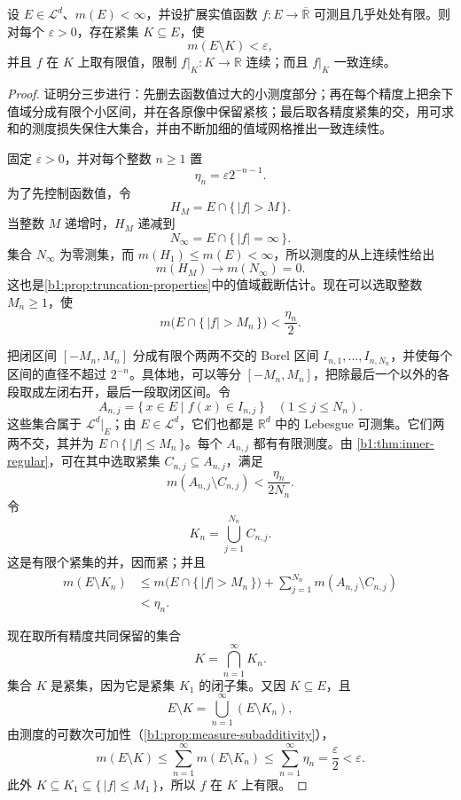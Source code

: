 \begin{theorem}[Lusin]
\label{b1:thm:lusin}
设 \(E\in\mathcal L^d\)、\(m(E)<\infty\)，并设扩展实值函数
\(f:E\rightarrow\overline{\mathbb R}\) 可测且几乎处处有限。则对每个
\(\varepsilon>0\)，存在紧集 \(K\subseteq E\)，使
\[
m(E\setminus K)<\varepsilon,
\]
并且 \(f\) 在 \(K\) 上取有限值，限制 \(f|_K:K\rightarrow\mathbb R\) 连续；而且 \(f|_K\) 一致连续。
\end{theorem}
\begin{proof}
证明分三步进行：先删去函数值过大的小测度部分；再在每个精度上把余下值域分成有限个小区间，并在各原像中保留紧核；最后取各精度紧集的交，用可求和的测度损失保住大集合，并由不断加细的值域网格推出一致连续性。

固定 \(\varepsilon>0\)，并对每个整数 \(n\geq1\) 置
\[
\eta_n=\varepsilon 2^{-n-1}.
\]
为了先控制函数值，令
\[
H_M=E\cap\{\,|f|>M\,\}.
\]
当整数 \(M\) 递增时，\(H_M\) 递减到
\[
N_\infty=E\cap\{\,|f|=\infty\,\}.
\]
集合 \(N_\infty\) 为零测集，而 \(m(H_1)\leq m(E)<\infty\)，所以测度的从上连续性给出
\[
m(H_M)\longrightarrow m(N_\infty)=0.
\]
这也是\cref{b1:prop:truncation-properties}中的值域截断估计。现在可以选取整数 \(M_n\geq1\)，使
\[
m\bigl(E\cap\{\,|f|>M_n\,\}\bigr)<\frac{\eta_n}{2}.
\]

把闭区间 \([-M_n,M_n]\) 分成有限个两两不交的 Borel 区间
\(I_{n,1},\ldots,I_{n,N_n}\)，并使每个区间的直径不超过
\(2^{-n}\)。具体地，可以等分 \([-M_n,M_n]\)，把除最后一个以外的各段取成左闭右开，最后一段取闭区间。令
\[
A_{n,j}
=\{\,x\in E\mid f(x)\in I_{n,j}\,\}
\quad(1\leq j\leq N_n).
\]
这些集合属于 \(\mathcal L^d|_E\)；由 \(E\in\mathcal L^d\)，它们也都是 \(\mathbb R^d\) 中的 Lebesgue 可测集。它们两两不交，其并为
\(E\cap\{\,|f|\leq M_n\,\}\)。每个 \(A_{n,j}\) 都有有限测度。由%
\cref{b1:thm:inner-regular}，可在其中选取紧集
\(C_{n,j}\subseteq A_{n,j}\)，满足
\[
m(A_{n,j}\setminus C_{n,j})
<\frac{\eta_n}{2N_n}.
\]
令
\[
K_n=\bigcup_{j=1}^{N_n}C_{n,j}.
\]
这是有限个紧集的并，因而紧；并且
\begin{align*}
m(E\setminus K_n)
&\leq m\bigl(E\cap\{\,|f|>M_n\,\}\bigr)
  +\sum_{j=1}^{N_n}m(A_{n,j}\setminus C_{n,j}) \\
&<\eta_n.
\end{align*}

现在取所有精度共同保留的集合
\[
K=\bigcap_{n=1}^{\infty}K_n.
\]
集合 \(K\) 是紧集，因为它是紧集 \(K_1\) 的闭子集。又因
\(K\subseteq E\)，且
\[
E\setminus K
=\bigcup_{n=1}^{\infty}(E\setminus K_n),
\]
由测度的可数次可加性（\cref{b1:prop:measure-subadditivity}），
\[
m(E\setminus K)
\leq\sum_{n=1}^{\infty}m(E\setminus K_n)
\leq\sum_{n=1}^{\infty}\eta_n
=\frac{\varepsilon}{2}<\varepsilon.
\]
此外 \(K\subseteq K_1\subseteq\{\,|f|\leq M_1\,\}\)，所以 \(f\) 在 \(K\) 上有限。


\end{proof}
